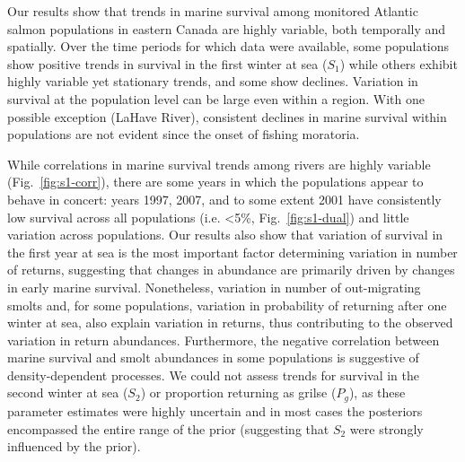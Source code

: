 \documentclass[12pt]{article}
\newcommand{\So}{$S_{1}$\xspace}
\newcommand{\St}{$S_{2}$\xspace}
\newcommand{\Pg}{$P_g$\xspace}
\begin{document}

Our results show that trends in marine survival among monitored Atlantic salmon
populations in eastern Canada are highly variable, both temporally and
spatially. Over the time periods for which data were available, some
populations show positive trends in survival in the first winter at sea (\So)
while others exhibit highly variable yet stationary trends, and some show declines.
Variation in survival at the population level can be large even within a
region. With one possible exception (LaHave River), consistent declines in
marine survival within populations are not evident since the onset of fishing
moratoria.

While correlations in marine survival trends among rivers are highly
variable (Fig.~\ref{fig:s1-corr}),
there are some years in which the populations appear to behave in concert:
years 1997, 2007, and to some extent 2001 have consistently low survival across all populations
(i.e. <5\%, Fig.~\ref{fig:s1-dual}) and little variation across populations.
Our results also show that variation of survival in the first year at sea is the most
important factor determining variation in number of returns, suggesting that
changes in abundance are primarily driven by changes in early marine survival.
Nonetheless, variation in number of out-migrating smolts and, for some populations,
variation in probability of returning after one winter at sea, also explain
variation in returns, thus contributing to the observed variation in return abundances.
Furthermore, the negative correlation between marine survival and smolt
abundances in some populations is suggestive of density-dependent processes.
We could not assess trends for survival in the second winter at sea (\St) or
proportion returning as grilse (\Pg), as these parameter estimates were highly
uncertain and in most cases the posteriors encompassed the entire range of
the prior (suggesting that \St were strongly influenced by the prior).

\end{document}
